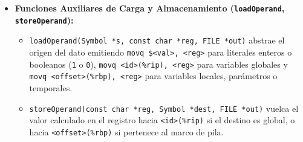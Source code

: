 \documentclass[12pt, a4paper]{article}
\begin{document}
\begin{itemize}
    \item \textbf{Funciones Auxiliares de Carga y Almacenamiento (\texttt{loadOperand}, \texttt{storeOperand}):}
    \begin{itemize}
        \item \texttt{loadOperand(Symbol *s, const char *reg, FILE *out)} abstrae el origen del dato emitiendo \texttt{movq \$<val>, <reg>} para literales enteros o booleanos (\texttt{1} o \texttt{0}), \texttt{movq <id>(\%rip), <reg>} para variables globales y \texttt{movq <offset>(\%rbp), <reg>} para variables locales, parámetros o temporales.
        \item \texttt{storeOperand(const char *reg, Symbol *dest, FILE *out)} vuelca el valor calculado en el registro hacia \texttt{<id>(\%rip)} si el destino es global, o hacia \texttt{<offset>(\%rbp)} si pertenece al marco de pila.
    \end{itemize}


\end{itemize}
\end{document}
